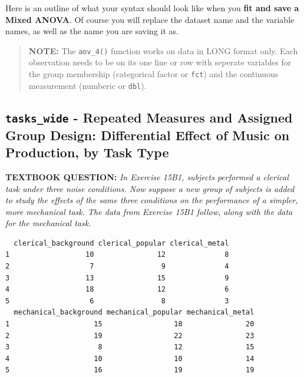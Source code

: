 \documentclass[]{article}
\newenvironment{Shaded}{\begin{snugshade}}{\end{snugshade}}
\newcommand{\KeywordTok}[1]{\textcolor[rgb]{0.13,0.29,0.53}{\textbf{#1}}}
\newcommand{\DataTypeTok}[1]{\textcolor[rgb]{0.13,0.29,0.53}{#1}}
\newcommand{\StringTok}[1]{\textcolor[rgb]{0.31,0.60,0.02}{#1}}
\newcommand{\CommentTok}[1]{\textcolor[rgb]{0.56,0.35,0.01}{\textit{#1}}}
\newcommand{\OperatorTok}[1]{\textcolor[rgb]{0.81,0.36,0.00}{\textbf{#1}}}
\newcommand{\NormalTok}[1]{#1}
\begin{document}
Here is an outline of what your syntax should look like when you
\textbf{fit and save a Mixed ANOVA}. Of course you will replace the
dataset name and the variable names, as well as the name you are saving
it as.

\begin{quote}
\textbf{NOTE:} The \texttt{aov\_4()} function works on data in LONG
format only. Each observation needs to be on its one line or row with
seperate variables for the group membership (categorical factor or
\texttt{fct}) and the continuous measurement (numberic or \texttt{dbl}).
\end{quote}

\begin{Shaded}
\end{Shaded}

\clearpage

\subsection{\texorpdfstring{\texttt{tasks\_wide} - Repeated Measures and
Assigned Group Design: Differential Effect of Music on Production, by
Task
Type}{tasks\_wide - Repeated Measures and Assigned Group Design: Differential Effect of Music on Production, by Task Type}}\label{tasks_wide---repeated-measures-and-assigned-group-design-differential-effect-of-music-on-production-by-task-type}

\textbf{TEXTBOOK QUESTION:} \emph{In Exercise 15B1, subjects performed a
clerical task under three noise conditions. Now suppose a new group of
subjects is added to study the effects of the same three conditions on
the performance of a simpler, more mechanical task. The data from
Exercise 15B1 follow, along with the data for the mechanical task.}

\begin{verbatim}
  clerical_background clerical_popular clerical_metal
1                  10               12              8
2                   7                9              4
3                  13               15              9
4                  18               12              6
5                   6                8              3
  mechanical_background mechanical_popular mechanical_metal
1                    15                 18               20
2                    19                 22               23
3                     8                 12               15
4                    10                 10               14
5                    16                 19               19
\end{verbatim}
\end{document}
